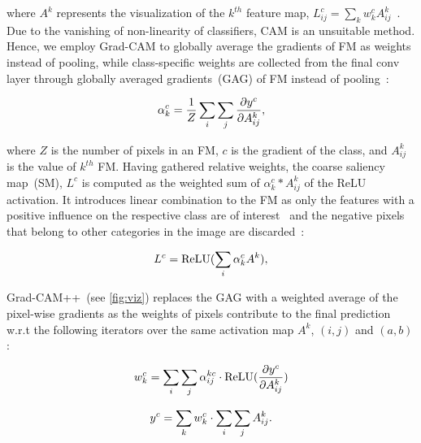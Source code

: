 \documentclass[conference]{IEEEtran}
\begin{document}
where $A^{k}$ represents the visualization of the $k^{th}$ feature map, $L_{i j}^{c}=\sum_{k} w_{k}^{c} A^k_{ij}$~\cite{kim2020extending}. Due to the vanishing of non-linearity of classifiers, CAM is an unsuitable method. Hence, we employ Grad-CAM to globally average the gradients of FM as weights instead of pooling, while class-specific weights are collected from the final conv layer through globally averaged gradients~(GAG) of FM instead of pooling~\cite{chattopadhay2018grad}: 

\begin{equation}
\scriptsize{
    \alpha_k^c=\frac{1}{Z}\sum_{i}\sum_{j}\frac{\partial y^c}{\partial A_{ij}^k},}
    \label{eq:alpha}
\end{equation}

where $Z$ is the number of pixels in an FM, $c$ is the gradient of the class, and $A_{ij}^k$ is the value of $k^{th}$ FM. Having gathered relative weights, the coarse saliency map~(SM), $L^c$ is computed as the weighted sum of $\alpha_k^c*A_{ij}^k$ of the ReLU activation.
It introduces linear combination to the FM as only the features with a positive influence on the respective class are of interest~\cite{chattopadhay2018grad} and the negative pixels that belong to other categories in the image are discarded~\cite{114}:

\vspace{-2mm}
\begin{equation}
\scriptsize{
    L^c=\operatorname{ReLU}(\sum_{i}\alpha_k^cA^k),}
    \label{3.11}
\end{equation}
\vspace{-4mm}

Grad-CAM++~(see \cref{fig:viz}) replaces the GAG with a weighted average of the pixel-wise gradients as the weights of pixels contribute to the final prediction w.r.t the following iterators over the same activation map $A^k$, $(i,j)$ and $(a,b)$: 

\vspace{-2mm}
\begin{equation}
\scriptsize{
    w_k^c=\sum_{i}\sum_{j}\alpha_{ij}^{kc}\cdot \operatorname{ReLU}(\frac{\partial y^c}{\partial A_{ij}^k})}
\end{equation}
\vspace{-2mm}

\begin{equation}
\scriptsize{
    y^c=\sum_{k}w_k^c\cdot \sum_{i}\sum_{j}A_{ij}^k.} 
\end{equation}
\vspace{-4mm}
\end{document}
